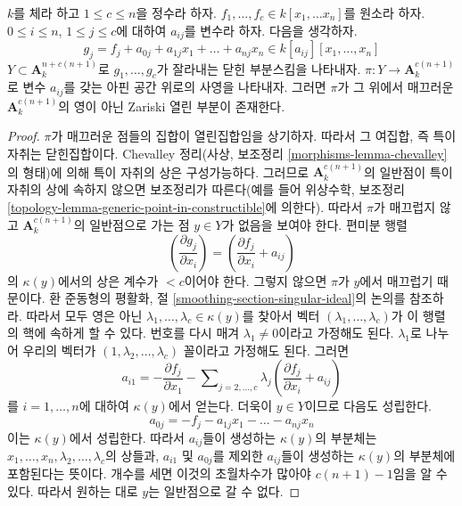 \begin{lemma}
\label{lemma-jouanolou-type-thing}
$k$를 체라 하고 $1 \leq c \leq n$을 정수라 하자.
$f_1, \ldots, f_c \in k[x_1, \ldots x_n]$를 원소라 하자.%
$0 \leq i \leq n$, $1 \leq j \leq c$에 대하여 $a_{ij}$를 변수라 하자.
다음을 생각하자.
$$
g_j = f_j + a_{0j} + a_{1j}x_1 + \ldots + a_{nj}x_n \in
k[a_{ij}][x_1, \ldots, x_n]
$$
$Y \subset \mathbf{A}^{n + c(n + 1)}_k$로 $g_1, \ldots, g_c$가 잘라내는
닫힌 부분스킴을 나타내자. $\pi : Y \to \mathbf{A}^{c(n + 1)}_k$로
변수 $a_{ij}$를 갖는 아핀 공간 위로의 사영을 나타내자. 그러면
$\pi$가 그 위에서 매끄러운 $\mathbf{A}^{c(n + 1)}_k$의 영이 아닌
Zariski 열린 부분이 존재한다.%
\end{lemma}

\begin{proof}
$\pi$가 매끄러운 점들의 집합이 열린집합임을 상기하자. 따라서 그 여집합,
즉 특이 자취는 닫힌집합이다. Chevalley 정리(사상, 보조정리
\ref{morphisms-lemma-chevalley}의 형태)에 의해 특이 자취의 상은
구성가능하다. 그러므로 $\mathbf{A}^{c(n + 1)}_k$의 일반점이 특이 자취의
상에 속하지 않으면 보조정리가 따른다(예를 들어 위상수학, 보조정리
\ref{topology-lemma-generic-point-in-constructible}에 의한다). 따라서
$\pi$가 매끄럽지 않고 $\mathbf{A}^{c(n + 1)}_k$의 일반점으로 가는 점
$y \in Y$가 없음을 보여야 한다. 편미분 행렬
$$
(\frac{\partial g_j}{\partial x_i}) =
(\frac{\partial f_j}{\partial x_i} + a_{ij})
$$
의 $\kappa(y)$에서의 상은 계수가 $< c$이어야 한다. 그렇지 않으면
$\pi$가 $y$에서 매끄럽기 때문이다. 환 준동형의 평활화, 절
\ref{smoothing-section-singular-ideal}의 논의를 참조하라. 따라서 모두
영은 아닌 $\lambda_1, \ldots, \lambda_c \in \kappa(y)$를 찾아서 벡터
$(\lambda_1, \ldots, \lambda_c)$가 이 행렬의 핵에 속하게 할 수 있다.
번호를 다시 매겨 $\lambda_1 \not = 0$이라고 가정해도 된다.
$\lambda_1$로 나누어 우리의 벡터가
$(1, \lambda_2, \ldots, \lambda_c)$ 꼴이라고 가정해도 된다. 그러면
$$
a_{i1} = -
\frac{\partial f_j}{\partial x_1} -
\sum\nolimits_{j = 2, \ldots, c} \lambda_j(\frac{\partial f_j}{\partial x_i} + a_{ij})
$$
를 $i = 1, \ldots, n$에 대하여 $\kappa(y)$에서 얻는다.%
더욱이 $y \in Y$이므로 다음도 성립한다.
$$
a_{0j} = -f_j - a_{1j}x_1 - \ldots - a_{nj}x_n
$$
이는 $\kappa(y)$에서 성립한다. 따라서 $a_{ij}$들이 생성하는 $\kappa(y)$의
부분체는 $x_1, \ldots, x_n, \lambda_2, \ldots, \lambda_c$의 상들과,
$a_{i1}$ 및 $a_{0j}$를 제외한 $a_{ij}$들이 생성하는 $\kappa(y)$의
부분체에 포함된다는 뜻이다. 개수를 세면 이것의 초월차수가 많아야
$c(n + 1) - 1$임을 알 수 있다. 따라서 원하는 대로 $y$는 일반점으로
갈 수 없다.
\end{proof}

